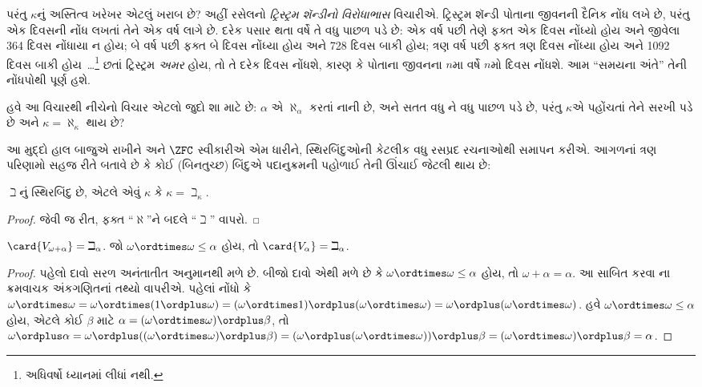 \documentclass[../../../include/open-logic-section]{subfiles}
\begin{document}
પરંતુ $\kappa$નું અસ્તિત્વ ખરેખર એટલું ખરાબ છે?
અહીં રસેલનો \emph{ટ્રિસ્ટ્રમ શૅન્ડીનો વિરોધાભાસ}
વિચારીએ. ટ્રિસ્ટ્રમ શૅન્ડી પોતાના જીવનની દૈનિક
નોંધ લખે છે, પરંતુ એક દિવસની નોંધ લખતાં તેને એક
વર્ષ લાગે છે. દરેક પસાર થતા વર્ષે તે વધુ પાછળ
પડે છે: એક વર્ષ પછી તેણે ફક્ત એક દિવસ નોંધ્યો
હોય અને જીવેલા 364 દિવસ નોંધાયા ન હોય; બે વર્ષ
પછી ફક્ત બે દિવસ નોંધ્યા હોય અને 728 દિવસ બાકી
હોય; ત્રણ વર્ષ પછી ફક્ત ત્રણ દિવસ નોંધ્યા હોય
અને 1092 દિવસ બાકી હોય~\dots\footnote{અધિવર્ષો
ધ્યાનમાં લીધાં નથી.} છતાં ટ્રિસ્ટ્રમ
\emph{અમર} હોય, તો તે દરેક દિવસ નોંધશે, કારણ
કે પોતાના જીવનના $n$મા વર્ષે $n$મો દિવસ
નોંધશે. આમ ``સમયના અંતે'' તેની નોંધપોથી પૂર્ણ હશે.

હવે આ વિચારથી નીચેનો વિચાર એટલો જુદો શા માટે
છે: $\alpha$ એ $\aleph_\alpha$ કરતાં નાની છે,
અને સતત વધુ ને વધુ પાછળ પડે છે, પરંતુ
$\kappa$એ પહોંચતાં તેને સરખી પડે છે અને
$\kappa = \aleph_\kappa$ થાય છે?

આ મુદ્દો હાલ બાજુએ રાખીને અને $\ZFC$ સ્વીકારીએ
એમ ધારીને, સ્થિરબિંદુઓની કેટલીક વધુ રસપ્રદ
રચનાઓથી સમાપન કરીએ. આગળનાં ત્રણ પરિણામો સહજ
રીતે બતાવે છે કે કોઈ (બિનતુચ્છ) બિંદુએ પદાનુક્રમની
પહોળાઈ તેની ઊંચાઈ જેટલી થાય છે:

\begin{prop}
$\beth$નું સ્થિરબિંદુ છે, એટલે એવું $\kappa$ કે
$\kappa=\beth_\kappa$.
\end{prop}

\begin{proof}
 જેવી જ રીત, ફક્ત ``$\aleph$''ને
બદલે ``$\beth$'' વાપરો.
\end{proof}

\begin{prop}
$\card{V_{\omega+\alpha}} = \beth_{\alpha}$.
જો $\omega \ordtimes \omega \leq \alpha$ હોય, તો
$\card{V_\alpha} = \beth_\alpha$.
\end{prop}

\begin{proof}
પહેલો દાવો સરળ અનંતાતીત અનુમાનથી મળે છે. બીજો
દાવો એથી મળે છે કે $\omega \ordtimes \omega
\leq \alpha$ હોય, તો $\omega + \alpha = \alpha$.
આ સાબિત કરવા
ના ક્રમવાચક અંકગણિતનાં
તથ્યો વાપરીએ. પહેલાં નોંધો કે
$\omega \ordtimes \omega = \omega \ordtimes (1 \ordplus \omega) =
(\omega  \ordtimes 1) \ordplus (\omega\ordtimes\omega) = \omega
\ordplus (\omega \ordtimes \omega)$.
હવે $\omega \ordtimes \omega \leq \alpha$
હોય, એટલે કોઈ $\beta$ માટે
$\alpha = (\omega\ordtimes\omega) \ordplus \beta$,
તો $\omega \ordplus \alpha = \omega \ordplus
((\omega \ordtimes \omega) \ordplus \beta) =
(\omega \ordplus (\omega \ordtimes \omega)) \ordplus
\beta = (\omega \ordtimes \omega) \ordplus
\beta = \alpha$.
\end{proof}
\end{document}
